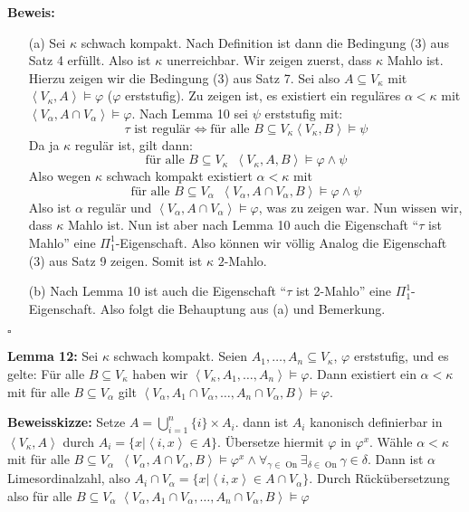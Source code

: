 \documentclass[a4paper,fontsize=11pt]{scrartcl}
\newcommand{\On}{\operatorname{On}}
\begin{document}
{\bf Beweis:}
\begin{itemize}
\item[(a)] Sei $\kappa$ schwach kompakt. Nach Definition ist dann die
  Bedingung (3) aus Satz 4 erfüllt. Also ist $\kappa$
  unerreichbar. Wir zeigen zuerst, dass $\kappa$ Mahlo ist. Hierzu
  zeigen wir die Bedingung (3) aus Satz 7. Sei also $A\subseteq
  V_\kappa$ mit $\left<V_\kappa,A\right>\models\varphi$ ($\varphi$
  erststufig). Zu zeigen ist, es existiert ein reguläres
  $\alpha<\kappa$ mit $\left<V_\alpha,A\cap
  V_\alpha\right>\models\varphi$. Nach Lemma 10 sei $\psi$ erststufig
  mit:
  $$ \tau\mbox{ ist regulär}\Leftrightarrow\mbox{für alle }B\subseteq
  V_\kappa\left<V_\kappa,B\right>\models\psi$$
  Da ja $\kappa$ regulär ist, gilt dann:
  $$ \mbox{für alle }B\subseteq
  V_\kappa\phantom{a}\left<V_\kappa,A,B\right>\models\varphi\wedge\psi$$
  Also wegen $\kappa$ schwach kompakt existiert $\alpha<\kappa$ mit
  $$ \mbox{für alle }B\subseteq
  V_\alpha\phantom{a}\left<V_\alpha,A\cap
  V_\alpha,B\right>\models\varphi\wedge\psi$$ Also ist $\alpha$
  regulär und $\left<V_\alpha,A\cap V_\alpha\right>\models\varphi$,
  was zu zeigen war. Nun wissen wir, dass $\kappa$ Mahlo ist. Nun ist
  aber nach Lemma 10 auch die Eigenschaft ``$\tau$ ist Mahlo'' eine
  $\Pi_1^1$-Eigenschaft. Also können wir völlig Analog die Eigenschaft
  (3) aus Satz 9 zeigen. Somit ist $\kappa$ $2$-Mahlo.
\item[(b)] Nach Lemma 10 ist auch die Eigenschaft ``$\tau$ ist
  2-Mahlo'' eine $\Pi_1^1$-Eigenschaft. Also folgt die Behauptung aus
  (a) und Bemerkung.
\end{itemize}

\hfill $\square$

{\bf Lemma 12:} Sei $\kappa$ schwach kompakt. Seien
$A_1,\ldots,A_n\subseteq V_\kappa$, $\varphi$ erststufig, und es
gelte: Für alle $B\subseteq V_\kappa$ haben wir
$\left<V_\kappa,A_1,\ldots,A_n\right>\models\varphi$. Dann existiert
ein $\alpha<\kappa$ mit für alle $B\subseteq V_\alpha$ gilt
$\left<V_\alpha,A_1\cap V_\alpha,\ldots,A_n\cap
V_\alpha,B\right>\models\varphi$.

{\bf Beweisskizze:} Setze $A=\bigcup_{i=1}^{n}\{i\}\times A_i$. dann
ist $A_i$ kanonisch definierbar in $\left<V_\kappa,A\right>$ durch
$A_i=\{x|\left<i,x\right>\in A\}$. Übersetze hiermit $\varphi$ in
$\varphi^x$. Wähle $\alpha<\kappa$ mit für alle $B\subseteq
V_\alpha\phantom{a}\left<V_\alpha,A\cap
V_\alpha,B\right>\models\varphi^x \wedge
\forall_{\gamma\in\On}\exists_{\delta\in\On}\gamma\in\delta$. Dann ist
$\alpha$ Limesordinalzahl, also $A_i\cap
V_\alpha=\{x|\left<i,x\right>\in A\cap V_\alpha\}$. Durch
Rückübersetzung also für alle $B\subseteq V_\alpha$
$\left<V_\alpha,A_1\cap V_\alpha,\ldots,A_n\cap
V_\alpha,B\right>\models\varphi$
\end{document}
